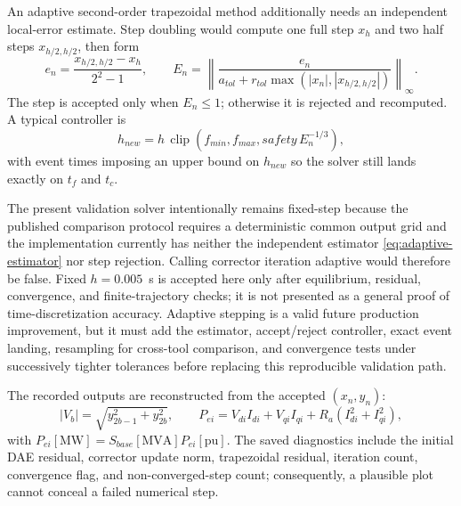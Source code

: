 \documentclass[12pt,a4paper]{article}
\begin{document}
An adaptive second-order trapezoidal method additionally needs an independent
local-error estimate. Step doubling would compute one full step $x_h$ and two
half steps $x_{h/2,h/2}$, then form
\begin{equation}
e_n=\frac{x_{h/2,h/2}-x_h}{2^2-1},\qquad
E_n=\left\|
\frac{e_n}{a_{tol}+r_{tol}\max(|x_n|,|x_{h/2,h/2}|)}
\right\|_\infty.
\label{eq:adaptive-estimator}
\end{equation}
The step is accepted only when $E_n\le1$; otherwise it is rejected and
recomputed. A typical controller is
\begin{equation}
h_{new}=h\,
\operatorname{clip}\left(f_{min},f_{max},
safety\,E_n^{-1/3}\right),
\label{eq:adaptive-controller}
\end{equation}
with event times imposing an upper bound on $h_{new}$ so the solver still lands
exactly on $t_f$ and $t_c$.

The present validation solver intentionally remains fixed-step because the
published comparison protocol requires a deterministic common output grid and
the implementation currently has neither the independent estimator
\eqref{eq:adaptive-estimator} nor step rejection. Calling corrector iteration
adaptive would therefore be false. Fixed $h=0.005$~s is accepted here only
after equilibrium, residual, convergence, and finite-trajectory checks; it is
not presented as a general proof of time-discretization accuracy. Adaptive
stepping is a valid future production improvement, but it must add the
estimator, accept/reject controller, exact event landing, resampling for
cross-tool comparison, and convergence tests under successively tighter
tolerances before replacing this reproducible validation path.

The recorded outputs are reconstructed from the accepted $(x_n,y_n)$:
\begin{equation}
|V_b|=\sqrt{y_{2b-1}^2+y_{2b}^2},\qquad
P_{ei}=V_{di}I_{di}+V_{qi}I_{qi}+R_a(I_{di}^2+I_{qi}^2),
\end{equation}
with $P_{ei}[\mathrm{MW}]=S_{base}[\mathrm{MVA}]P_{ei}[\mathrm{pu}]$.
The saved diagnostics include the initial DAE residual, corrector update norm,
trapezoidal residual, iteration count, convergence flag, and non-converged-step
count; consequently, a plausible plot cannot conceal a failed numerical step.

\begin{table}[H]\centering
\caption{Time-domain-simulation input contract, numerical status, and response
extrema for the 0--20~s bus-101 fault scenario with
$Z_f=j10^{-4}$~pu, $t_f=1.0$~s, $t_c=1.1$~s, and
$\Delta t=0.005$~s.}
\label{tab:ts-summary}

\end{table}
\end{document}
